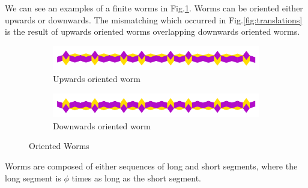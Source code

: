 \documentclass[
  oneside,
  11pt, a4paper,
  footinclude=true,
  headinclude=true,
  cleardoublepage=empty
]{scrbook}
\begin{document}
We can see an examples of a finite worms in Fig.\ref{fig:worm}. Worms can be oriented either upwards or downwards. The mismatching which occurred in Fig.\ref{fig:translations} is the result of upwards oriented worms overlapping downwards oriented worms. 
\begin{figure}[H]
\centering
\begin{subfigure}{\textwidth}
\centering
\includegraphics[width=\textwidth]{reWorm}
\caption{Upwards oriented worm}
\end{subfigure}

\begin{subfigure}{\textwidth}
\centering
\includegraphics[width=\textwidth]{reWormDown}
\caption{Downwards oriented worm}
\end{subfigure}

\caption{Oriented Worms}
\label{fig:worm}
\end{figure}
Worms are composed of either sequences of long and short segments, where the long segment is $\phi$ times as long as the short segment.
\end{document}
